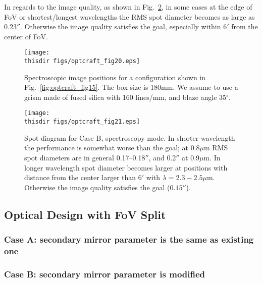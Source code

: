 In regards to the image quality, as shown in
Fig.~\ref{fig:optcraft_fig21}, in some cases at the edge of FoV or
shortest/longest wavelengths the RMS spot diameter becomes as large as 
$0.23''$. Otherwise the image quality satisfies the goal, especially
within $6'$ from the center of FoV.

\begin{figure}[!ht]
\centerline{
\texttt{[image: \\thisdir figs/optcraft\_fig20.eps]}
}
\caption{
Spectroscopic image positions for a configuration shown in
 Fig.~\ref{fig:optcraft_fig15}. The box size is 180mm. We assume to use
 a grism made of fused silica with 160 lines/mm, and blaze angle
 35$^\circ$.
}
\label{fig:optcraft_fig20}
\end{figure}

\begin{figure}[!ht]
\centerline{
\texttt{[image: \\thisdir figs/optcraft\_fig21.eps]}
}
\caption{Spot diagram for Case B, spectroscopy mode.
In shorter wavelength the performance is somewhat worse than the goal;
 at 0.8$\mu$m RMS spot diameters are in general 0.17--0.18$''$, and 
 0.2$''$ at 0.9$\mu$m. In longer wavelength spot diameter becomes larger
 at positions with distance from the center larger than $6'$ with
 $\lambda = 2.3-2.5\mu$m. Otherwise the image quality satisfies the goal
 ($0.15''$).
}
\label{fig:optcraft_fig21}
\end{figure}



\subsection{Optical Design with FoV Split}

\subsubsection{Case A: secondary mirror parameter is the same as
   existing one}

\subsubsection{Case B: secondary mirror parameter is modified}



